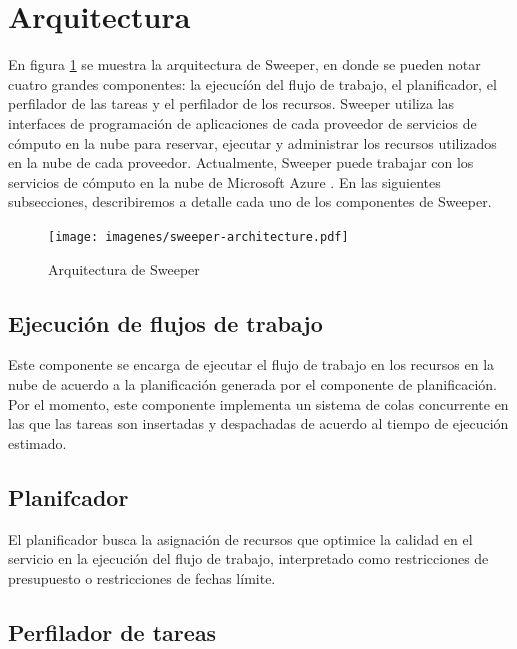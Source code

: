 \section{Arquitectura}

En figura \ref{fig:sweeper-arch} se muestra la arquitectura de Sweeper, en donde se pueden notar cuatro grandes componentes: la ejecucíón del flujo de trabajo, el planificador, el perfilador de las tareas y el perfilador de los recursos. Sweeper utiliza las interfaces de programación de aplicaciones de cada proveedor de servicios de cómputo en la nube para reservar, ejecutar y administrar los recursos utilizados en la nube de cada proveedor. Actualmente, Sweeper puede trabajar con los servicios de cómputo en la nube de Microsoft Azure \cite{microsoft2015azure}. En las siguientes subsecciones, describiremos a detalle cada uno de los componentes de Sweeper.

\begin{figure}
\begin{center}
\texttt{[image: imagenes/sweeper-architecture.pdf]}
\end{center}
\caption{Arquitectura de Sweeper}
\label{fig:sweeper-arch}
\end{figure}


\subsection{Ejecución de flujos de trabajo}

Este componente se encarga de ejecutar el flujo de trabajo en los recursos en la nube de acuerdo a la planificación generada por el componente de planificación. Por el momento, este componente implementa un sistema de colas concurrente en las que las tareas son insertadas y despachadas de acuerdo al tiempo de ejecución estimado.



\subsection{Planifcador}

El planificador busca la asignación de recursos que optimice la calidad en el servicio en la ejecución del flujo de trabajo, interpretado como restricciones de presupuesto o restricciones de fechas límite. 



\subsection{Perfilador de tareas}

